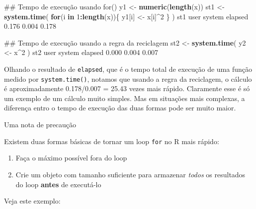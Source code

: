 \documentclass[10pt,a4paper]{book}
\newenvironment{Shaded}{\begin{snugshade}}{\end{snugshade}}
\newcommand{\KeywordTok}[1]{\textcolor[rgb]{0.13,0.29,0.53}{\textbf{#1}}}
\newcommand{\DecValTok}[1]{\textcolor[rgb]{0.00,0.00,0.81}{#1}}
\newcommand{\FloatTok}[1]{\textcolor[rgb]{0.00,0.00,0.81}{#1}}
\newcommand{\StringTok}[1]{\textcolor[rgb]{0.31,0.60,0.02}{#1}}
\newcommand{\ControlFlowTok}[1]{\textcolor[rgb]{0.13,0.29,0.53}{\textbf{#1}}}
\newcommand{\OperatorTok}[1]{\textcolor[rgb]{0.81,0.36,0.00}{\textbf{#1}}}
\newcommand{\NormalTok}[1]{#1}
\providecommand{\tightlist}{%
  \setlength{\itemsep}{0pt}\setlength{\parskip}{0pt}}
\begin{document}
\begin{Shaded}
\begin{Highlighting}[]
\NormalTok{## Tempo de execução usando for()}
\NormalTok{y1 <-}\StringTok{ }\KeywordTok{numeric}\NormalTok{(}\KeywordTok{length}\NormalTok{(x))}
\NormalTok{st1 <-}\StringTok{ }\KeywordTok{system.time}\NormalTok{(}
    \ControlFlowTok{for}\NormalTok{(i }\ControlFlowTok{in} \DecValTok{1}\OperatorTok{:}\KeywordTok{length}\NormalTok{(x))\{}
\NormalTok{        y1[i] <-}\StringTok{ }\NormalTok{x[i]}\OperatorTok{^}\DecValTok{2}
\NormalTok{    \}}
\NormalTok{)}
\NormalTok{st1}
\NormalTok{   user  system elapsed }
  \FloatTok{0.176}   \FloatTok{0.004}   \FloatTok{0.178} 

\NormalTok{## Tempo de execução usando a regra da reciclagem}
\NormalTok{st2 <-}\StringTok{ }\KeywordTok{system.time}\NormalTok{(}
\NormalTok{    y2 <-}\StringTok{ }\NormalTok{x}\OperatorTok{^}\DecValTok{2}
\NormalTok{)}
\NormalTok{st2}
\NormalTok{   user  system elapsed }
  \FloatTok{0.000}   \FloatTok{0.004}   \FloatTok{0.007} 
\end{Highlighting}
\end{Shaded}

Olhando o resultado de \texttt{elapsed}, que é o tempo total de execução
de uma função medido por \texttt{system.time()}, notamos que usando a
regra da reciclagem, o cálculo é aproximadamente 0.178/0.007 = 25.43
vezes mais rápido. Claramente esse é só um exemplo de um cálculo muito
simples. Mas em situações mais complexas, a diferença entro o tempo de
execução das duas formas pode ser muito maior.

Uma nota de precaução

Existem duas formas básicas de tornar um loop \texttt{for} no R mais
rápido:

\begin{enumerate}
\def\labelenumi{\arabic{enumi}.}
\tightlist
\item
  Faça o máximo possível fora do loop
\item
  Crie um objeto com tamanho suficiente para armazenar \emph{todos} os
  resultados do loop \textbf{antes} de executá-lo
\end{enumerate}

Veja este exemplo:
\end{document}
